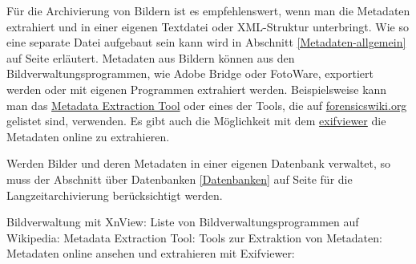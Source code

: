Für die Archivierung von Bildern ist es empfehlenswert, wenn man die Metadaten extrahiert und in einer eigenen Textdatei oder XML-Struktur unterbringt. Wie so eine separate Datei aufgebaut sein kann wird in Abschnitt \ref{Metadaten-allgemein} auf Seite \pageref{Metadaten-allgemein} erläutert. Metadaten aus Bildern können aus den Bildverwaltungsprogrammen, wie Adobe Bridge oder FotoWare, exportiert werden oder mit eigenen Programmen extrahiert werden. Beispielsweise kann man das \href{http://meta-extractor.sourceforge.net/}{Metadata Extraction Tool} oder eines der Tools, die auf \href{http://www.forensicswiki.org/wiki/Document_Metadata_Extraction\#Images}{forensicswiki.org} gelistet sind, verwenden. Es gibt auch die Möglichkeit mit dem \href{http://www.exifviewer.org/}{exifviewer} die Metadaten online zu extrahieren.

Werden Bilder und deren Metadaten in einer eigenen Datenbank verwaltet, so muss der Abschnitt über Datenbanken \ref{Datenbanken} auf Seite \pageref{Datenbanken} für die Langzeitarchivierung berücksichtigt werden.

\begin{flushleft}
	Bildverwaltung mit XnView: \linebreak
	Liste von Bildverwaltungsprogrammen auf Wikipedia: \linebreak
	Metadata Extraction Tool: \linebreak
	Tools zur Extraktion von Metadaten: \linebreak
	Metadaten online ansehen und extrahieren mit Exifviewer: 
\end{flushleft}

